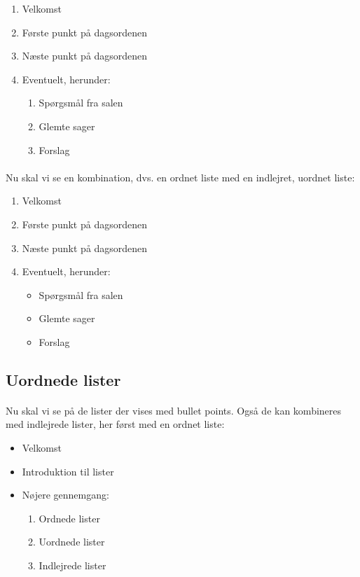 \documentclass{article}
\begin{document}
\begin{enumerate}
    \item Velkomst
    \item Første punkt på dagsordenen
    \item Næste punkt på dagsordenen
    \item Eventuelt, herunder:
    \begin{enumerate}
        \item Spørgsmål fra salen
        \item Glemte sager
        \item Forslag
    \end{enumerate}
\end{enumerate}
\paragraph{}
Nu skal vi se en kombination, dvs. en ordnet liste med en indlejret, uordnet liste:
\begin{enumerate}
    \item Velkomst
    \item Første punkt på dagsordenen
    \item Næste punkt på dagsordenen
    \item Eventuelt, herunder:
    \begin{itemize}
        \item Spørgsmål fra salen
        \item Glemte sager
        \item Forslag
    \end{itemize}
\end{enumerate}
\subsection{Uordnede lister}
\paragraph{}
Nu skal vi se på de lister der vises med bullet points. Også de kan kombineres med indlejrede lister, her først med en ordnet liste:
\begin{itemize}
    \item Velkomst
    \item Introduktion til lister
    \item Nøjere gennemgang:
    \begin{enumerate}
        \item Ordnede lister
        \item Uordnede lister
        \item Indlejrede lister
    \end{enumerate}
\end{itemize}
\end{document}
